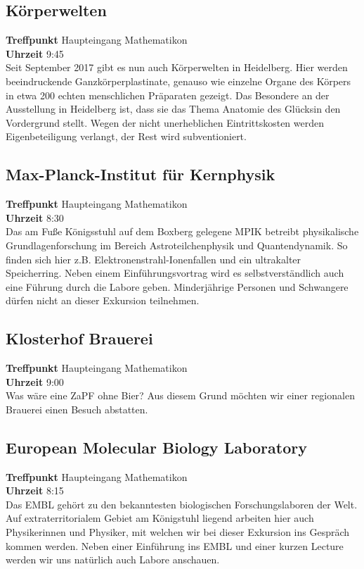 \subsection*{Körperwelten}
\textbf{Treffpunkt} Haupteingang Mathematikon\\
\textbf{Uhrzeit} 9:45\\
Seit September 2017 gibt es nun auch Körperwelten in Heidelberg. Hier werden beeindruckende Ganzkörperplastinate, genauso wie einzelne Organe des Körpers in etwa 200 echten menschlichen Präparaten gezeigt. Das Besondere an der Ausstellung in Heidelberg ist, dass sie das Thema \flqq Anatomie des Glücks\frqq in den Vordergrund stellt. Wegen der nicht unerheblichen Eintrittskosten werden  Eigenbeteiligung verlangt, der Rest wird subventioniert. 

\subsection*{Max-Planck-Institut für Kernphysik}
\textbf{Treffpunkt} Haupteingang Mathematikon\\
\textbf{Uhrzeit} 8:30\\
Das am Fuße Königsstuhl auf dem Boxberg gelegene MPIK betreibt physikalische Grundlagenforschung im Bereich Astroteilchenphysik und Quantendynamik. So finden sich hier z.B. Elektronenstrahl-Ionenfallen und ein ultrakalter Speicherring. Neben einem Einführungsvortrag wird es selbstverständlich auch eine Führung durch die Labore geben. Minderjährige Personen und Schwangere dürfen nicht an dieser Exkursion teilnehmen. 

\subsection*{Klosterhof Brauerei}
\textbf{Treffpunkt} Haupteingang Mathematikon\\
\textbf{Uhrzeit} 9:00\\
Was wäre eine ZaPF ohne Bier? Aus diesem Grund möchten wir einer regionalen Brauerei einen Besuch abstatten. 

\subsection*{European Molecular Biology Laboratory}
\textbf{Treffpunkt} Haupteingang Mathematikon \\
\textbf{Uhrzeit} 8:15\\
Das EMBL gehört zu den bekanntesten biologischen Forschungslaboren der Welt. Auf extraterritorialem Gebiet am Königstuhl liegend arbeiten hier auch Physikerinnen und Physiker, mit welchen wir bei dieser Exkursion ins Gespräch kommen werden. Neben einer Einführung ins EMBL und einer kurzen \flqq Lecture \frqq werden wir uns natürlich auch Labore anschauen.

